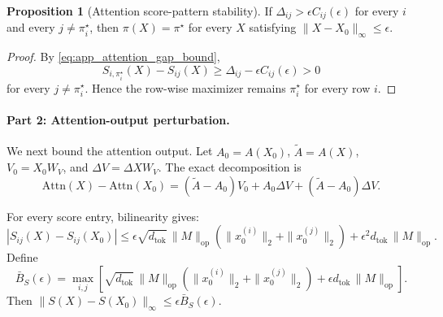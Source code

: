 \documentclass{article}
\theoremstyle{definition}
\newtheorem{proposition}[theorem]{Proposition}
\begin{document}
\begin{proposition}[Attention score-pattern stability]
If $\Delta_{ij}>\epsilon C_{ij}(\epsilon)$ for every $i$ and every $j\neq\pi_i^\star$, then $\pi(X)=\pi^\star$ for every $X$ satisfying $\|X-X_0\|_\infty\leq\epsilon$.
\end{proposition}

\begin{proof}
By \eqref{eq:app_attention_gap_bound},
\begin{equation}
    S_{i,\pi_i^\star}(X)-S_{ij}(X)
    \geq
    \Delta_{ij}-\epsilon C_{ij}(\epsilon)
    >
    0
\end{equation}
for every $j\neq\pi_i^\star$. Hence the row-wise maximizer remains $\pi_i^\star$ for every row $i$.
\end{proof}

\paragraph{Part 2: Attention-output perturbation.}
We next bound the attention output. Let $A_0=A(X_0)$, $\widetilde A=A(X)$, $V_0=X_0W_V$, and $\Delta V=\Delta XW_V$. The exact decomposition is
\begin{equation}
    \mathrm{Attn}(X)-\mathrm{Attn}(X_0)
    =
    (\widetilde A-A_0)V_0
    +
    A_0\Delta V
    +
    (\widetilde A-A_0)\Delta V.
    \label{eq:app_attention_decomposition}
\end{equation}

For every score entry, bilinearity gives:
\begin{equation}
    |S_{ij}(X)-S_{ij}(X_0)|
    \leq
    \epsilon\sqrt{d_{\mathrm{tok}}}\,\|M\|_{\mathrm{op}}
    \left(
        \|x_0^{(i)}\|_2+\|x_0^{(j)}\|_2
    \right)
    +
    \epsilon^2 d_{\mathrm{tok}}\,\|M\|_{\mathrm{op}}.
    \label{eq:app_attention_score_entry}
\end{equation}
Define
\begin{equation}
    \bar B_S(\epsilon)
    =
    \max_{i,j}
    \left[
        \sqrt{d_{\mathrm{tok}}}\,\|M\|_{\mathrm{op}}
        \left(
            \|x_0^{(i)}\|_2+\|x_0^{(j)}\|_2
        \right)
        +
        \epsilon d_{\mathrm{tok}}\,\|M\|_{\mathrm{op}}
    \right].
    \label{eq:app_attention_BS}
\end{equation}
Then $\|S(X)-S(X_0)\|_\infty\leq\epsilon\bar B_S(\epsilon)$.
\end{document}
